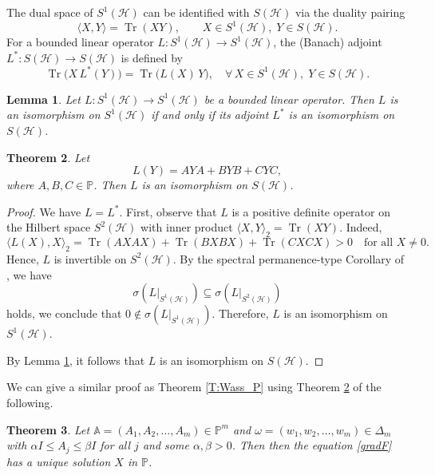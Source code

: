 \documentclass[12pt,reqno]{amsart}
\newtheorem{theorem}{Theorem}[section]
\newtheorem{lemma}[theorem]{Lemma}
\begin{document}
The dual space of $S^{1}(\mathcal{H})$ can be identified with $S(\mathcal{H})$ via the duality pairing
\[
\langle X, Y \rangle = \operatorname{Tr}(XY), \qquad X \in S^{1}(\mathcal{H}), \; Y \in S(\mathcal{H}).
\]
For a bounded linear operator $L : S^{1}(\mathcal{H}) \to S^{1}(\mathcal{H})$,
the (Banach) adjoint $L^{*} : S(\mathcal{H}) \to S(\mathcal{H})$ is defined by
\[
\operatorname{Tr}\big(X\,L^{*}(Y)\big)
= \operatorname{Tr}\big(L(X)\,Y\big),
\quad \forall\, X \in S^{1}(\mathcal{H}),\; Y \in S(\mathcal{H}).
\]


\begin{lemma} \label{L:iso}
Let $L : S^{1}(\mathcal{H}) \to S^{1}(\mathcal{H})$ be a bounded linear operator.
Then $L$ is an isomorphism on $S^{1}(\mathcal{H})$ if and only if its adjoint
$L^{*}$ is an isomorphism on $S(\mathcal{H})$.
\end{lemma}


\begin{theorem}\label{inv}
Let
\[
L(Y) = AYA + BYB + CYC,
\]
where $A, B, C \in \mathbb{P}$. Then $L$ is an isomorphism on $S(\mathcal{H})$.
\end{theorem}

\begin{proof}
We have $L = L^{*}$. First, observe that $L$ is a positive definite operator on the Hilbert space $S^{2}(\mathcal{H})$ with inner product
$\langle X, Y \rangle_{2} = \operatorname{Tr}(XY)$. Indeed,
\[
\langle L(X), X \rangle_{2}
= \operatorname{Tr}(A X A X) + \operatorname{Tr}(B X B X) + \operatorname{Tr}(C X C X)
> 0
\quad \text{for all } X \neq 0.
\]
Hence, $L$ is invertible on $S^{2}(\mathcal{H})$. By the spectral permanence-type Corollary of \cite{DN}, we have
\begin{equation}\label{eq:inv}
\sigma(L|_{S^{1}(\mathcal{H})}) \subseteq \sigma(L|_{S^{2}(\mathcal{H})})
\end{equation}
holds, we conclude that $0 \notin \sigma(L|_{S^{1}(\mathcal{H})})$.
Therefore, $L$ is an isomorphism on $S^{1}(\mathcal{H})$.

By Lemma \ref{L:iso}, it follows that $L$ is an isomorphism on $S(\mathcal{H})$.
\end{proof}



We can give a similar proof as Theorem \ref{T:Wass_P}  using Theorem \ref{inv} of  the following.
\begin{theorem}\label{wass_P}
Let $\mathbb{A } =(A_1, A_2, \ldots, A_m) \in \mathbb{P}^{m}$ and $\omega = (w_{1}, w_{2}, \dots, w_{m}) \in \Delta_{m}$ with $\alpha I \leq A_j \leq \beta I$ for all $j$ and some $\alpha, \beta > 0$. Then then the equation \eqref{gradF} has a unique solution $X$ in $\mathbb{P}$.
\end{theorem}
\end{document}
